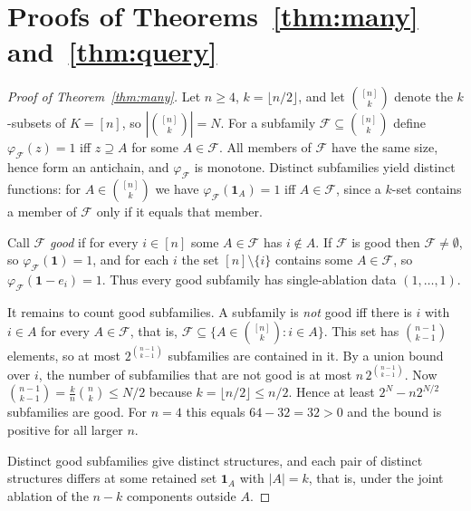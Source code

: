 \documentclass[11pt]{article}
\theoremstyle{definition}
\theoremstyle{remark}
\begin{document}
\appendix
\section{Proofs of Theorems~\ref{thm:many} and~\ref{thm:query}}\label{app:proofs}

\begin{proof}[Proof of Theorem~\ref{thm:many}]
Let $n\ge 4$, $k=\lfloor n/2\rfloor$, and let $\binom{[n]}{k}$ denote the $k$-subsets of $K=[n]$, so $|\binom{[n]}{k}|=N$. For a subfamily $\mathcal F\subseteq\binom{[n]}{k}$ define $\varphi_{\mathcal F}(z)=1$ iff $z\supseteq A$ for some $A\in\mathcal F$. All members of $\mathcal F$ have the same size, hence form an antichain, and $\varphi_{\mathcal F}$ is monotone. Distinct subfamilies yield distinct functions: for $A\in\binom{[n]}{k}$ we have $\varphi_{\mathcal F}(\mathbf 1_A)=1$ iff $A\in\mathcal F$, since a $k$-set contains a member of $\mathcal F$ only if it equals that member.

Call $\mathcal F$ \emph{good} if for every $i\in[n]$ some $A\in\mathcal F$ has $i\notin A$. If $\mathcal F$ is good then $\mathcal F\ne\emptyset$, so $\varphi_{\mathcal F}(\mathbf 1)=1$, and for each $i$ the set $[n]\setminus\{i\}$ contains some $A\in\mathcal F$, so $\varphi_{\mathcal F}(\mathbf 1-e_i)=1$. Thus every good subfamily has single-ablation data $(1,\dots,1)$.

It remains to count good subfamilies. A subfamily is \emph{not} good iff there is $i$ with $i\in A$ for every $A\in\mathcal F$, that is, $\mathcal F\subseteq\{A\in\binom{[n]}{k}:i\in A\}$. This set has $\binom{n-1}{k-1}$ elements, so at most $2^{\binom{n-1}{k-1}}$ subfamilies are contained in it. By a union bound over $i$, the number of subfamilies that are not good is at most $n\,2^{\binom{n-1}{k-1}}$. Now $\binom{n-1}{k-1}=\frac{k}{n}\binom nk\le N/2$ because $k=\lfloor n/2\rfloor\le n/2$. Hence at least $2^N-n2^{N/2}$ subfamilies are good. For $n=4$ this equals $64-32=32>0$ and the bound is positive for all larger $n$.

Distinct good subfamilies give distinct structures, and each pair of distinct structures differs at some retained set $\mathbf 1_A$ with $|A|=k$, that is, under the joint ablation of the $n-k$ components outside $A$.
\end{proof}
\end{document}
